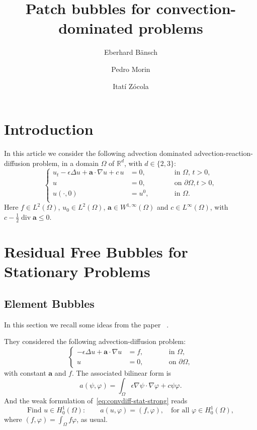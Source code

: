 \documentclass{article}
\title{Patch bubbles for convection-dominated problems}
\author{Eberhard B\"ansch \and Pedro Morin \and Itatí Zócola}
\date{}
\newcommand{\R}{\ensuremath{\mathbb{R}}\xspace}
\newcommand{\aaa}{\ensuremath{\mathbf{a}}\xspace}
\DeclareMathOperator{\Div}{div}
\newcommand{\tfa}{\text{for all }}
\newcommand{\Hoi}[1][\Omega]{\ensuremath{H_0^1(#1)}\xspace}
\begin{document}
	\maketitle


\tableofcontents


\section{Introduction}
In this article we consider the following advection dominated advection-reaction-diffusion problem, in a domain $\Omega$ of $\R^d$, with $d\in\{2,3\}$:
\begin{equation*}
    \left\{
\begin{aligned}
    u_t - \epsilon \Delta u + \aaa\cdot \nabla u + c \, u &=0 ,\qquad& &\text{in $\Omega$, $t>0$,}\\
        u &= 0, \qquad& &\text{on $\partial\Omega$}, t>0,\\
    u(\cdot,0) &= u^0, \qquad& & \text{in }\Omega.\\
\end{aligned}
    \right.
\end{equation*}
Here
$f\in L^2(\Omega)$,
$u_0 \in L^2(\Omega)$, 
$\aaa \in W^{1,\infty}(\Omega)$ and $c\in L^\infty(\Omega)$, with 
$c-\frac12 \Div \aaa \le 0$.



\section{Residual Free Bubbles for Stationary Problems}




\subsection{Element Bubbles}


In this section we recall some ideas from the paper~\cite{Brezzi1999}%
.

They considered the following advection-diffusion problem:
\begin{equation}\label{eq:convdiff-stat-strong}
    \left\{
\begin{aligned}
    - \epsilon \Delta u + \aaa\cdot \nabla u &=f ,\qquad& &\text{in $\Omega$,}\\
        u &= 0, \qquad& &\text{on $\partial\Omega$}, 
\end{aligned}
    \right.
\end{equation}
with constant $\aaa$ and $f$.
The associated bilinear form is
\[
a(\psi,\varphi) = \int_\Omega \epsilon \nabla \psi \cdot \nabla \varphi + c \psi \varphi.
\]
And the weak formulation of~\eqref{eq:convdiff-stat-strong} reads
\[
\text{Find } u \in \Hoi : \qquad a(u,\varphi) = (f,\varphi), \quad\tfa \varphi \in \Hoi,
\]
where $(f,\varphi)=\int_\Omega f\varphi$, as usual.
\end{document}
